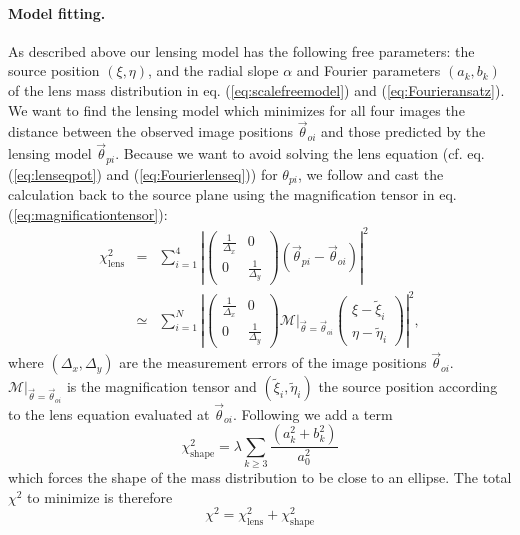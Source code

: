 \paragraph{Model fitting.} As described above our lensing model has the following free parameters: the source position $(\xi,\eta)$, and the radial slope $\alpha$ and Fourier parameters $(a_k,b_k)$ of the lens mass distribution in eq. (\ref{eq:scalefreemodel}) and (\ref{eq:Fourieransatz}). We want to find the lensing model which minimizes for all four images the distance between the observed image positions $\vec{\theta}_{oi}$ and those predicted by the lensing model $\vec{\theta}_{pi}$. Because we want to avoid solving the lens equation (cf. eq. (\ref{eq:lenseqpot}) and (\ref{eq:Fourierlenseq})) for $\theta_{pi}$, we follow \citet{1991ApJ...373..354K} and cast the calculation back to the source plane using the magnification tensor in eq. (\ref{eq:magnificationtensor}):
\begin{eqnarray*}
\chi^2_\text{lens} &=& \sum_{i=1}^{4} \left|\left( \begin{matrix} \frac{1}{\Delta_x} & 0\\0 & \frac{1}{\Delta_y}\end{matrix}\right) \left( \vec{\theta}_{pi} - \vec{\theta}_{oi} \right)\right|^2\\
&\simeq& \sum_{i=1}^{N} \left|\left( \begin{matrix} \frac{1}{\Delta_x} & 0\\0 & \frac{1}{\Delta_y}\end{matrix}\right)  \left.\mathscr{M}\right|_{\vec{\theta}=\vec{\theta}_{oi}} \left( \begin{matrix} \xi - \tilde{\xi}_i \\ \eta - \tilde{\eta}_i \end{matrix} \right) \right|^2,
\end{eqnarray*}
where $(\Delta_x,\Delta_y)$ are the measurement errors of the image positions $\vec{\theta}_{oi}$. $\left.\mathscr{M}\right|_{\vec{\theta}=\vec{\theta}_{oi}}$ is the magnification tensor and $(\tilde{\xi}_i,\tilde{\eta}_i)$ the source position according to the lens equation evaluated at $\vec{\theta}_{oi}$. Following \citet{GlennEC} we add a term
\begin{equation*}
\chi^2_\text{shape} = \lambda \sum_{k \geq 3} \frac{\left(a_k^2 +b_k^2 \right)}{a_0^2} 
\end{equation*}
which forces the shape of the mass distribution to be close to an ellipse. The total $\chi^2$ to minimize is therefore
\begin{equation*}
\chi^2 = \chi^2_\text{lens} + \chi^2_\text{shape}
\end{equation*}
